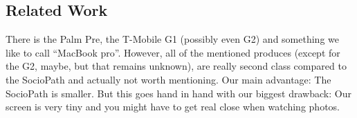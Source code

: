 %
%
%
\subsection{Related Work}

There is the Palm Pre, the T-Mobile G1 (possibly even G2) and something we like to call ``MacBook pro''.
However, all of the mentioned produces (except for the G2, maybe, but that remains unknown), are really second class
compared to the SocioPath and actually not worth mentioning. Our main advantage: The SocioPath is smaller.
But this goes hand in hand with our biggest drawback: Our screen is very tiny and you might have to get real close
when watching photos.